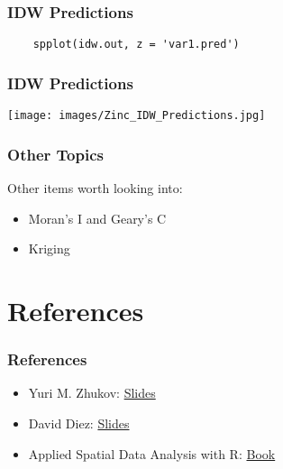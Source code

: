 \documentclass{beamer}
\begin{document}
\begin{frame}[fragile]
	\frametitle{IDW Predictions}

	\begin{verbatim}
	spplot(idw.out, z = 'var1.pred')
	\end{verbatim}
\end{frame}

\frame
{
	\frametitle{IDW Predictions}

	\begin{center}
		\texttt{[image: images/Zinc\_IDW\_Predictions.jpg]}
	\end{center}
}

\frame
{
	\frametitle{Other Topics}
	
	Other items worth looking into:
	
	\begin{itemize}
		\item<1->{Moran's I and Geary's C}
		\item<2->{Kriging}
	\end{itemize}
}

\section{References}

\frame
{
	\frametitle{References}

	\begin{itemize}
		\item<1->{Yuri M. Zhukov: \hyperlink{http://www.people.fas.harvard.edu/~zhukov/spatial.html}{Slides}}
		\item<2->{David Diez: \hyperlink{http://scc.stat.ucla.edu/page_attachments/0000/0094/spatial_R_1_09S.pdf}{Slides}}
		\item<3->{Applied Spatial Data Analysis with R: \hyperlink{http://www.asdar-book.org}{Book}}
	\end{itemize}
}
\end{document}
